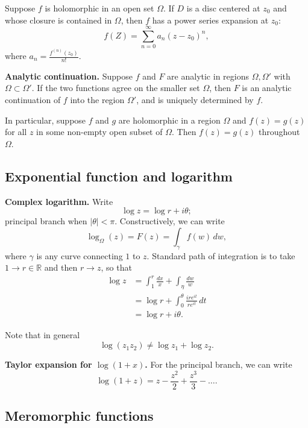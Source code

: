 \documentclass[12pt]{article}
\newcommand{\RR}{\mathbb{R}}
\begin{document}
        Suppose $f$ is holomorphic in an open set $\Omega$.  If $D$ is a disc centered at $z_0$ and whose closure is contained in $\Omega$, then $f$ has a power series expansion at $z_0:$
        \[
          f(Z) = \sum_{n=0}^{\infty} a_n (z- z_0)^n,
        \]
        where $a_n = \frac{f^{(n)}(z_0)}{n!}$.


        {\bf Analytic continuation.}  Suppose $f$ and $F$ are analytic in regions $\Omega, \Omega'$ with $\Omega \subset \Omega'$.  If the two functions agree on the smaller set $\Omega$, then $F$ is an analytic continuation of $f$ into the region $\Omega'$, and is uniquely determined by $f$.

        In particular, suppose $f$ and $g$ are holomorphic in a region $\Omega$ and $f(z) = g(z)$ for all $z$ in some non-empty open subset of $\Omega$.  Then $f(z) = g(z)$ throughout $\Omega$.

        \subsection{Exponential function and logarithm}

        {\bf Complex logarithm.} Write
        \[
          \log z = \log r + i \theta;
        \]
        principal branch when $|\theta| < \pi$.  Constructively, we can write
        \[
          \log_{\Omega}(z) = F(z) = \int_{\gamma} f(w) \, dw,
        \]
        where $\gamma$ is any curve connecting $1$ to $z$.  Standard path of integration is to take $1 \to r \in \RR$ and then $r \to z$, so that
        \begin{align*}
          \log z &= \int_{1}^{r} \frac{dx}{x} + \int_{\eta} \frac{dw}{w} \\
          &= \log r + \int_{0}^{\theta} \frac{i r e^{it}}{r e^{it}} \, dt \\
          &= \log r + i \theta.
        \end{align*}

        Note that in general
        \[
          \log(z_1 z_2) \neq \log z_1 + \log z_2.
        \]

        {\bf Taylor expansion for $\log(1+x)$.} For the principal branch, we can write
        \[
          \log(1+z) = z - \frac{z^2}{2} + \frac{z^3}{3} - \dots.
        \]




        \subsection{Meromorphic functions}
\end{document}
